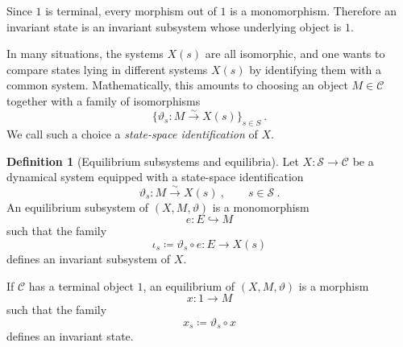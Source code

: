 \documentclass[a4paper,reqno,oneside]{amsart}
\theoremstyle{definition}
\newtheorem{definition}[theorem]{Definition}
\theoremstyle{remark}
\renewcommand{\theta}{\vartheta}
\numberwithin{equation}{section}
\begin{document}
	Since $1$ is terminal, every morphism out of $1$ is a monomorphism.
	Therefore an invariant state is an invariant subsystem whose underlying
	object is $1$.
	
	
	\medskip
	
	
	
	In many situations, the systems $X(s)$ are all isomorphic, and one wants to
	compare states lying in different systems $X(s)$ by identifying them with a
	common system. Mathematically, this amounts to choosing an object $M\in\mathcal C$ together with a family of isomorphisms
	\begin{equation}
		\{\theta_s\colon M\xrightarrow{\sim} X(s)\}_{s \in S} \ .
	\end{equation}
	We call such a choice a \textit{state-space identification} of $X$.
	
	
	
	\begin{definition}[Equilibrium subsystems and equilibria]
		Let $X\colon\mathcal S\to\mathcal C$ be a dynamical system equipped with a state-space identification
		\begin{equation}
			\theta_s\colon M\xrightarrow{\sim}X(s) \ ,
			\qquad s\in\mathcal S \ .
		\end{equation}
		An equilibrium subsystem of $(X,M,\theta)$ is a monomorphism
		\begin{equation}
			e\colon E\hookrightarrow M
		\end{equation}
		such that the family
		\begin{equation}
			\iota_s\coloneqq \theta_s\circ e
			\colon E\longrightarrow X(s)
		\end{equation}
		defines an invariant subsystem of $X$.
		
		If $\mathcal C$ has a terminal object $1$, an equilibrium of
		$(X,M,\theta)$ is a morphism
		\begin{equation}
			x\colon 1\longrightarrow M
		\end{equation}
		such that the family
		\begin{equation}
			x_s \coloneqq \theta_s \circ x
		\end{equation}
		defines an invariant state.
	\end{definition}
	
	
	\medskip
	
\end{document}
